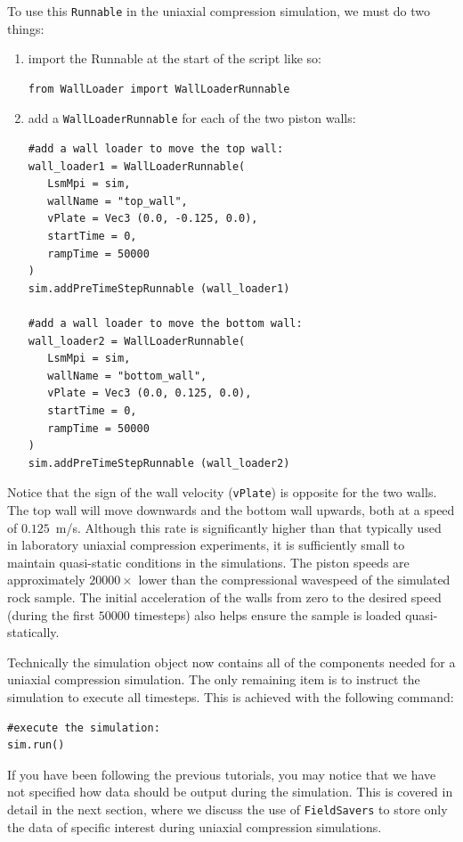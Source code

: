 To use this \texttt{Runnable} in the uniaxial compression simulation, we must do two things: 
\begin{enumerate}
\item import the Runnable at the start of the script like so:
\begin{verbatim}
from WallLoader import WallLoaderRunnable
\end{verbatim}
\item add a \texttt{WallLoaderRunnable} for each of the two piston walls:
\begin{verbatim}
#add a wall loader to move the top wall:
wall_loader1 = WallLoaderRunnable(
   LsmMpi = sim,
   wallName = "top_wall",
   vPlate = Vec3 (0.0, -0.125, 0.0),
   startTime = 0,
   rampTime = 50000
)
sim.addPreTimeStepRunnable (wall_loader1)

#add a wall loader to move the bottom wall:
wall_loader2 = WallLoaderRunnable(
   LsmMpi = sim,
   wallName = "bottom_wall",
   vPlate = Vec3 (0.0, 0.125, 0.0),
   startTime = 0,
   rampTime = 50000
)
sim.addPreTimeStepRunnable (wall_loader2)
\end{verbatim}
\end{enumerate}

\noindent
Notice that the sign of the wall velocity (\texttt{vPlate}) is opposite for the two walls. The top wall will move downwards and the bottom wall upwards, both at a speed of $0.125$~m/s. Although this rate is significantly higher than that typically used in laboratory uniaxial compression experiments, it is sufficiently small to maintain quasi-static conditions in the simulations. The piston speeds are approximately $20000 \times$ lower than the compressional wavespeed of the simulated rock sample. The initial acceleration of the walls from zero to the desired speed (during the first $50000$ timesteps) also helps ensure the sample is loaded quasi-statically. 

Technically the simulation object now contains all of the components needed for a uniaxial compression simulation.  The only remaining item is to instruct the simulation to execute all timesteps. This is achieved with the following command:

\begin{verbatim}
#execute the simulation:
sim.run()
\end{verbatim}

\noindent
If you have been following the previous tutorials, you may notice that we have not specified how data should be output during the simulation. This is covered in detail in the next section, where we discuss the use of \texttt{FieldSavers} to store only the data of specific interest during uniaxial compression simulations.


